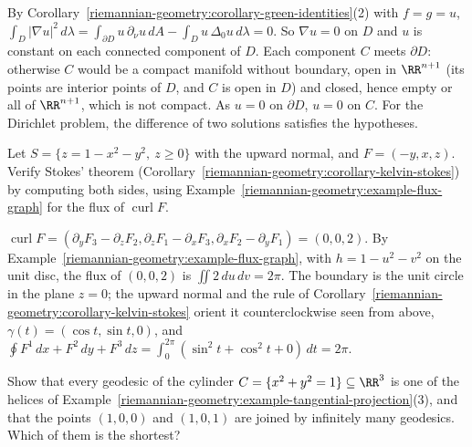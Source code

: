 \begin{solution}
By Corollary~\ref{riemannian-geometry:corollary-green-identities}(2) with $f = g = u$, $\int_D|\nabla u|^2\,d\lambda = \int_{\partial D}u\,\partial_\nu u\,dA - \int_Du\,\Delta_0u\,d\lambda = 0$. So $\nabla u = 0$ on $D$ and $u$ is
constant on each connected component of $D$. Each component $C$ meets $\partial D$: otherwise $C$ would be a compact manifold without boundary, open in $\RR^{n+1}$ (its points are interior points of $D$, and $C$
is open in $D$) and closed, hence empty or all of $\RR^{n+1}$, which is not compact. As $u = 0$ on $\partial D$, $u = 0$ on $C$. For the Dirichlet problem, the difference of two solutions satisfies the
hypotheses.
\end{solution}

\begin{exercise}\label{riemannian-geometry:exercise-stokes-paraboloid}
Let $S = \{z = 1 - x^2 - y^2,\ z \geq 0\}$ with the upward normal, and $F = (-y, x, z)$. Verify Stokes' theorem (Corollary~\ref{riemannian-geometry:corollary-kelvin-stokes}) by computing both sides, using
Example~\ref{riemannian-geometry:example-flux-graph} for the flux of $\operatorname{curl}F$.
\end{exercise}

\begin{solution}
$\operatorname{curl}F = (\partial_yF_3 - \partial_zF_2, \partial_zF_1 - \partial_xF_3, \partial_xF_2 - \partial_yF_1) = (0, 0, 2)$. By Example~\ref{riemannian-geometry:example-flux-graph}, with $h = 1 - u^2 - v^2$ on the unit disc, the
flux of $(0, 0, 2)$ is $\iint2\,du\,dv = 2\pi$. The boundary is the unit circle in the plane $z = 0$; the upward normal and the rule of Corollary~\ref{riemannian-geometry:corollary-kelvin-stokes} orient it
counterclockwise seen from above, $\gamma(t) = (\cos t, \sin t, 0)$, and $\oint F^1\,dx + F^2\,dy + F^3\,dz = \int_0^{2\pi}(\sin^2t + \cos^2t + 0)\,dt = 2\pi$.
\end{solution}

\begin{exercise}\label{riemannian-geometry:exercise-cylinder-geodesics}
Show that every geodesic of the cylinder $C = \{x^2 + y^2 = 1\} \subseteq \RR^3$ is one of the helices of Example~\ref{riemannian-geometry:example-tangential-projection}(3), and that the points $(1, 0, 0)$ and
$(1, 0, 1)$ are joined by infinitely many geodesics. Which of them is the shortest?
\end{exercise}

